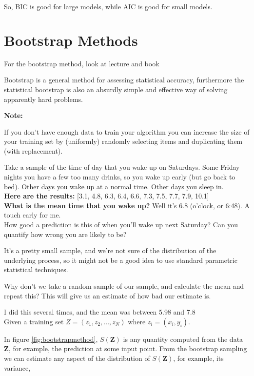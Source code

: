 So, BIC is good for large models, while AIC is good for small models.






\section{Bootstrap Methods}

For the bootstrap method, look at lecture  \cite[p.~46]{lecture2} and book \cite[p.~249]{friedman2016elements}

Bootstrap is a general method for assessing statistical accuracy, furthermore the statistical bootstrap is also an absurdly simple and effective way of solving apparently hard problems.

\textbf{Note:}

If you don't have enough data to train your algorithm you can increase the size of your training set by (uniformly) randomly selecting items and duplicating them (with replacement).

Take a sample of the time of day that you wake up on Saturdays. Some Friday nights you have a few too many drinks, so you wake up early (but go back to bed). Other days you wake up at a normal time. Other days you sleep in.\\

\textbf{Here are the results:} [3.1, 4.8, 6.3, 6.4, 6.6, 7.3, 7.5, 7.7, 7.9, 10.1]\\

\textbf{What is the mean time that you wake up?} Well it's 6.8 (o'clock, or 6:48). A touch early for me.\\

How good a prediction is this of when you'll wake up next Saturday? Can you quantify how wrong you are likely to be?

It's a pretty small sample, and we're not sure of the distribution of the underlying process, so it might not be a good idea to use standard parametric statistical techniques.

Why don't we take a random sample of our sample, and calculate the mean and repeat this? This will give us an estimate of how bad our estimate is.

I did this several times, and the mean was between 5.98 and 7.8\\

Given a training set $Z = (z_1, z_2, ... , z_N)$ where $z_i = (x_i, y_i)$.

In figure \ref{fig:bootstrapmethod}, $S(\bm{Z})$ is any quantity computed from the data $\bm{Z}$, for example, the prediction at some input point. From the bootstrap sampling we can estimate any aspect of the distribution of $S(\bm{Z})$, for example, its
variance,

